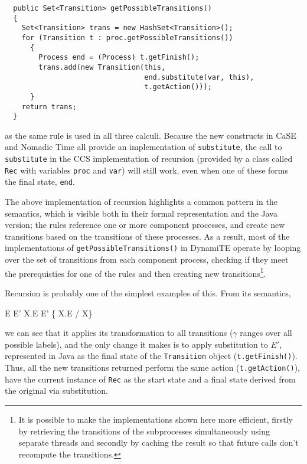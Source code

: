 \begin{verbatim}
  public Set<Transition> getPossibleTransitions()
  {
    Set<Transition> trans = new HashSet<Transition>();
    for (Transition t : proc.getPossibleTransitions())
      {
        Process end = (Process) t.getFinish();
        trans.add(new Transition(this,
                                 end.substitute(var, this),
                                 t.getAction()));
      }
    return trans;
  }
\end{verbatim}

\noindent as the same rule is used in all three calculi.  Because the
new constructs in CaSE and Nomadic Time all provide an implementation
of \texttt{substitute}, the call to \texttt{substitute} in the CCS
implementation of recursion (provided by a class called \texttt{Rec}
with variables \texttt{proc} and \texttt{var}) will still work, even
when one of these forms the final state, \texttt{end}.

The above implementation of recursion highlights a common pattern in
the semantics, which is visible both in their formal representation
and the Java version; the rules reference one or more component
processes, and create new transitions based on the transitions of
these processes.  As a result, most of the implementations of
\texttt{getPossibleTransitions()} in DynamiTE operate by looping over
the set of transitions from each component process, checking if they
meet the prerequisties for one of the rules and then creating new
transitions\footnote{It is possible to make the implementations shown
  here more efficient, firstly by retrieving the transitions of the
  subprocesses simultaneously using separate threads and secondly by
  caching the result so that future calls don't recompute the
  transitions.}.

Recursion is probably one of the simplest examples of this.  From its
semantics,
\begin{center}
      {E \derives{\gamma} E'}
      {\mu X.E \derives{\gamma} E' \{ \mu X.E / X\}}
      {}
\end{center}
\noindent we can see that it applies its transformation to all
transitions ($\gamma$ ranges over all possible labels), and the only
change it makes is to apply substitution to $E'$, represented in Java
as the final state of the \texttt{Transition} object
(\texttt{t.getFinish()}).  Thus, all the new transitions returned
perform the same action (\texttt{t.getAction()}), have the current
instance of \texttt{Rec} as the start state and a final state derived
from the original via substitution.

